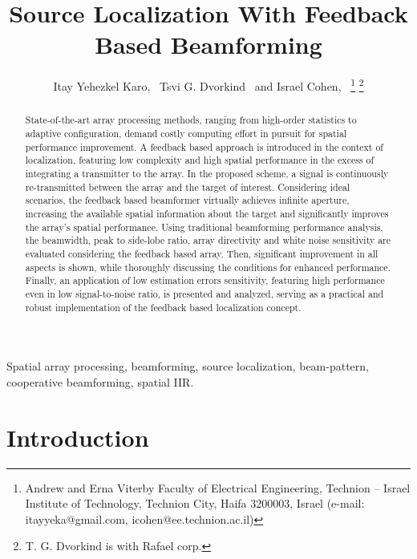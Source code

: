 \documentclass[journal]{IEEEtran}
\begin{document}
\title{Source Localization With Feedback Based Beamforming}
\author{Itay Yehezkel Karo,~\IEEEmembership{}
        Tsvi G. Dvorkind~\IEEEmembership{}
        and 
        Israel Cohen,~
\thanks{Andrew and Erna Viterby Faculty of Electrical Engineering, Technion -- Israel Institute of Technology, Technion City, Haifa 3200003, Israel (e-mail: itayyeka@gmail.com, icohen@ee.technion.ac.il)}%
\thanks{T. G. Dvorkind is with Rafael corp.}%
}
\markboth{}%
{}
\maketitle
\begin{abstract}
State-of-the-art array processing methods, ranging from high-order statistics to adaptive configuration, demand costly computing effort in pursuit for spatial performance improvement.
A feedback based approach is introduced in the context of localization, featuring low complexity and high spatial performance in the excess of integrating a transmitter to the array.  
In the proposed scheme, a signal is continuously re-transmitted between the array and the target of interest.
Considering ideal scenarios, the feedback based beamformer virtually achieves infinite aperture, increasing the available spatial information about the target and significantly improves the array's spatial performance.
Using traditional beamforming performance analysis, the beamwidth, peak to side-lobe ratio, array directivity and white noise sensitivity are evaluated considering the feedback based array.
Then, significant improvement in all aspects is shown, while thoroughly discussing the conditions for enhanced performance.
Finally, an application of low estimation errors sensitivity, featuring high performance even in low signal-to-noise ratio, is presented and analyzed, serving as a practical and robust implementation of the feedback based localization concept. 
\end{abstract}
\begin{IEEEkeywords}
Spatial array processing, beamforming, source localization, beam-pattern, cooperative beamforming, spatial IIR.
\end{IEEEkeywords}
\section{Introduction}

\end{document}
